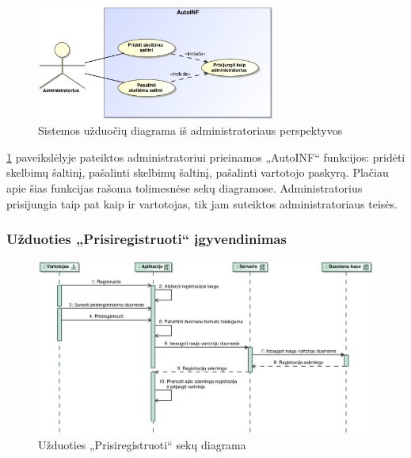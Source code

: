 \documentclass[12pt]{article}
\begin{document}
	\begin{figure}[h]
		\begin{center}
			\includegraphics[width=0.7\textwidth]{TikslaiAdministratorius.eps}
			\caption{Sistemos užduočių diagrama iš administratoriaus perspektyvos\label{UseCaseAdmin}}
		\end{center}
	\end{figure}	
	
	\ref{UseCaseAdmin} paveikslėlyje pateiktos administratoriui prieinamos „AutoINF“ funkcijos: pridėti skelbimų šaltinį, pašalinti skelbimų šaltinį, pašalinti vartotojo paskyrą. Plačiau apie šias funkcijas rašoma tolimesnėse sekų diagramose. Administratorius prisijungia taip pat kaip ir vartotojas, tik jam suteiktos administratoriaus teisės.
	\pagebreak
	
	\subsubsection{Užduoties „Prisiregistruoti“ įgyvendinimas}
	
	\begin{figure}[h]
		\begin{center}
			\includegraphics[width=\textwidth]{Prisiregistruoti.eps}
			\caption{Užduoties „Prisiregistruoti“ sekų diagrama\label{RegisterSeq}}
		\end{center}
	\end{figure}
	
\end{document}
